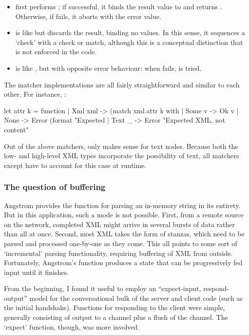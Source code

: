 \documentclass[12pt,a4paper,twoside,openright]{report}
\begin{document}
{\begin{itemize}
  \item {} first performs ; if successful, it binds the result value to  and returns . Otherwise, if  fails, it aborts with the error value.

  \item {} is like \code{>>=} but discards the result, binding no values. In this sense, it sequences a `check' with a check or match, although this is a conceptual distinction that is not enforced in the code.

  \item {} is like \code{*>}, but with opposite error behaviour: when  fails,  is tried.
\end{itemize}

The matcher implementations are all fairly straightforward and similar to each other. For instance, :

\begin{ocaml}
let attr k = function
  | Xml xml -> (match xml.attr k with
    | Some v -> Ok v
    | None -> Error (format "Expected %
  | Text _ -> Error "Expected XML, not content"
\end{ocaml}

Out of the above matchers, only  makes sense for text nodes. Because both the low- and high-level XML types incorporate the possibility of text, all matchers except  have to account for this case at runtime.

\subsubsection{The question of buffering}
Angstrom provides the  function for parsing an in-memory string in its entirety. But in this application, such a mode is not possible. First, from a remote source on the network, completed XML might arrive in several bursts of data rather than all at once. Second, most XML takes the form of stanzas, which need to be parsed and processed one-by-one as they come. This all points to some sort of `incremental' parsing functionality, requiring buffering of XML from outside. Fortunately, Angstrom's  function produces a state that can be progressively fed input until it finishes.

From the beginning, I found it useful to employ an ``expect-input, respond-output'' model for the conversational bulk of the server and client code (such as the initial handshake). Functions for responding to the client were simple, generally consisting of output to a channel plus a flush of the channel. The `expect' function, though, was more involved.

}
\end{document}

